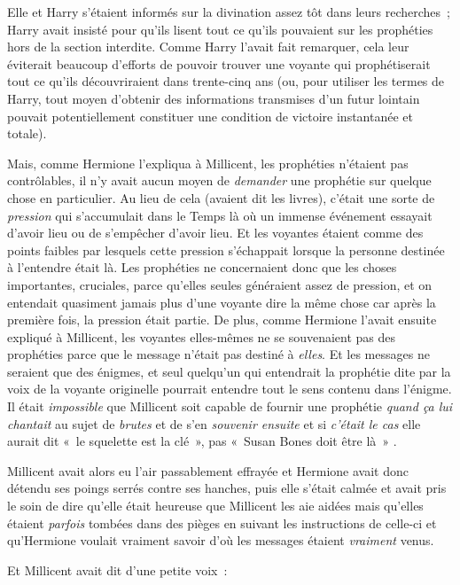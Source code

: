 Elle et Harry s'étaient informés sur la divination assez tôt dans leurs recherches~; Harry avait insisté pour qu'ils lisent tout ce qu'ils pouvaient sur les prophéties hors de la section interdite. Comme Harry l'avait fait remarquer, cela leur éviterait beaucoup d'efforts de pouvoir trouver une voyante qui prophétiserait tout ce qu'ils découvriraient dans trente-cinq ans (ou, pour utiliser les termes de Harry, tout moyen d'obtenir des informations transmises d'un futur lointain pouvait potentiellement constituer une condition de victoire instantanée et totale).

Mais, comme Hermione l'expliqua à Millicent, les prophéties n'étaient pas contrôlables, il n'y avait aucun moyen de \emph{demander} une prophétie sur quelque chose en particulier. Au lieu de cela (avaient dit les livres), c'était une sorte de \emph{pression} qui s'accumulait dans le Temps là où un immense événement essayait d'avoir lieu ou de s'empêcher d'avoir lieu. Et les voyantes étaient comme des points faibles par lesquels cette pression s'échappait lorsque la personne destinée à l'entendre était là. Les prophéties ne concernaient donc que les choses importantes, cruciales, parce qu'elles seules généraient assez de pression, et on entendait quasiment jamais plus d'une voyante dire la même chose car après la première fois, la pression était partie. De plus, comme Hermione l'avait ensuite expliqué à Millicent, les voyantes elles-mêmes ne se souvenaient pas des prophéties parce que le message n'était pas destiné à \emph{elles}. Et les messages ne seraient que des énigmes, et seul quelqu'un qui entendrait la prophétie dite par la voix de la voyante originelle pourrait entendre tout le sens contenu dans l'énigme. Il était \emph{impossible} que Millicent soit capable de fournir une prophétie \emph{quand ça lui chantait} au sujet de \emph{brutes} et de s'en \emph{souvenir ensuite} et si \emph{c'était le cas} elle aurait dit «~le squelette est la clé~», pas «~Susan Bones\footnotemark{} doit être là~»
.

Millicent avait alors eu l'air passablement effrayée et Hermione avait donc détendu ses poings serrés contre ses hanches, puis elle s'était calmée et avait pris le soin de dire qu'elle était heureuse que Millicent les aie aidées mais qu'elles étaient \emph{parfois} tombées dans des pièges en suivant les instructions de celle-ci et qu'Hermione voulait vraiment savoir d'où les messages étaient \emph{vraiment} venus.

Et Millicent avait dit d'une petite voix~:

